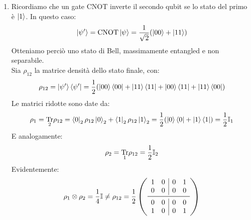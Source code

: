 \documentclass[../../InformazioneQuantistica.tex]{subfiles}
\begin{document}
\begin{enumerate}
\item Ricordiamo che un gate CNOT inverte il secondo qubit se lo stato del primo è $\Ket{1}$. In questo caso:
\begin{align*}
    \Ket{\psi'} = \operatorname{CNOT}\Ket{\psi} = \frac{1}{\sqrt{2}}(\Ket{00} + \Ket{11})
\end{align*}
Otteniamo perciò uno stato di Bell, massimamente entangled e non separabile.\\
Sia $\rho_{12}$ la matrice densità dello stato finale, con:
\begin{align*}
    \rho_{12} = \Ket{\psi'}\Bra{\psi'} = \frac{1}{2}(\Ket{00}\Bra{00} + \Ket{11}\Bra{11} + \Ket{00}\Bra{11} + \Ket{11}\Bra{00})
\end{align*}
Le matrici ridotte sono date da:
\begin{align*}
    \rho_1 = \underset{2}{\operatorname{Tr}} \rho_{12} = \Bra{0}_2 \rho_{12} \Ket{0}_2 + \Bra{1}_2 \rho_{12}\Ket{1}_2 = \frac{1}{2}(\Ket{0}\Bra{0} + \Ket{1}\Bra{1}) = \frac{1}{2}\mathbb{I}_1
\end{align*}
E analogamente:
\begin{align*}
    \rho_2 = \underset{1}{\operatorname{Tr}} \rho_{12} = \frac{1}{2}\mathbb{I}_2
\end{align*}
Evidentemente:
\begin{align*}
    \rho_1 \otimes \rho_2 = \frac{1}{4}\bb{I} \neq \rho_{12} = \frac{1}{2}\left(
    \begin{array}{cc|cc}
         1 & 0 & 0 & 1\\
         0 & 0 & 0 & 0\\ \midrule
         0 & 0 & 0 & 0\\
         1 & 0 & 0 & 1
    \end{array}
    \right)
\end{align*}


\end{enumerate}
\end{document}
